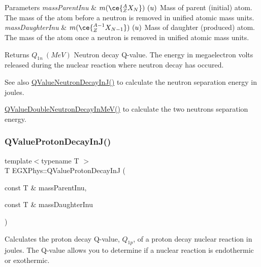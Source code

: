 \begin{DoxyParams}{Parameters}
{\em mass\+Parent\+Inu} & $m(\ce{ ^{A}_{Z}X_{N} })\ (u)$ Mass of parent (initial) atom. The mass of the atom before a neutron is removed in unified atomic mass units. \\
\hline
{\em mass\+Daughter\+Inu} & $m(\ce{ ^{A-1}_{Z}X_{N-1} })\ (u)$ Mass of daughter (produced) atom. The mass of the atom once a neutron is removed in unified atomic mass units. \\
\hline
\end{DoxyParams}
\begin{DoxyReturn}{Returns}
$Q_{1n}\ (MeV)$ Neutron decay Q-\/value. The energy in megaelectron volts released during the nuclear reaction where neutron decay has occured. 
\end{DoxyReturn}
\begin{DoxySeeAlso}{See also}
\hyperlink{group___e_g_x_phys-_q_value_gab9ffbd12c3f814e03f0ed1fbdcba0700}{Q\+Value\+Neutron\+Decay\+In\+J()} to calculate the neutron separation energy in joules. 

\hyperlink{group___e_g_x_phys-_q_value_ga6bfea723aca78b32ea67cc1ca7b4031b}{Q\+Value\+Double\+Neutron\+Decay\+In\+Me\+V()} to calculate the two neutrons separation energy. 
\end{DoxySeeAlso}
\mbox{\label{group___e_g_x_phys-_q_value_gaa344322393356bd442d17c992628218a}} 
\subsubsection{\texorpdfstring{Q\+Value\+Proton\+Decay\+In\+J()}{QValueProtonDecayInJ()}}
{\footnotesize\ttfamily template$<$typename T $>$ \\
T E\+G\+X\+Phys\+::\+Q\+Value\+Proton\+Decay\+InJ (\begin{DoxyParamCaption}\item[{const T \&}]{mass\+Parent\+Inu,  }\item[{const T \&}]{mass\+Daughter\+Inu }\end{DoxyParamCaption})}



Calculates the proton decay Q-\/value, $Q_{1p}$, of a proton decay nuclear reaction in joules. The Q-\/value allows you to determine if a nuclear reaction is endothermic or exothermic. 

